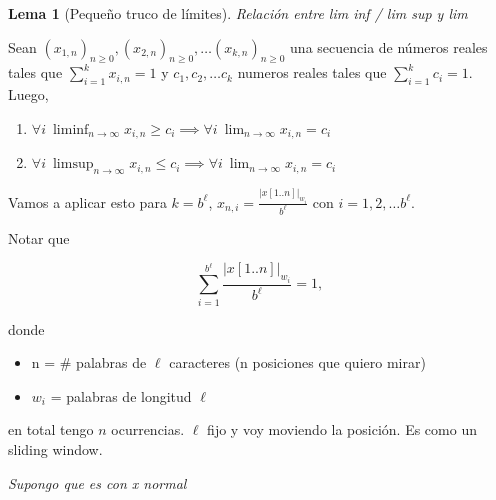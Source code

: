 \documentclass{report}
\theoremstyle{definition} %
\newtheorem{lemma}{Lema}[chapter]
\begin{document}
\begin{lemma}[Pequeño truco de límites]\label{prop:lim-trick}
    \textit{Relación entre lim inf / lim sup y lim}


    Sean $(x_{1, n})_{n\geq0}, (x_{2, n})_{n\geq0},\dots (x_{k, n})_{n\geq0}$
    una secuencia de números reales tales que $\sum_{i=1}^{k} x_{i, n} = 1$ y
    $c_1, c_2, \dots c_k$ numeros reales tales que $\sum_{i=1}^{k} c_i = 1$.
    Luego,
    
    \begin{enumerate}
        \item $\forall i\ \liminf_{n\to \infty} x_{i, n} \geq c_i
        \implies \forall i\ \lim_{n\to \infty} x_{i, n} = c_i$

        \item $\forall i\ \limsup_{n\to \infty} x_{i, n} \leq c_i
        \implies \forall i\ \lim_{n\to \infty} x_{i, n} = c_i$
    \end{enumerate}

    Vamos a aplicar esto para $k = b^\ell$, 
    $x_{n, i} = \frac{|x[1..n]|_{w_i}}{b^\ell}$ con $i = 1, 2, \dots b^\ell$.
    
    Notar que
    
    $$\sum_{i=1}^{b^\ell} \frac{|x[1..n]|_{w_i}}{b^\ell} = 1,$$
    
    donde

    \begin{itemize}
        \item n = \# palabras de $\ell$ caracteres (n posiciones que quiero mirar)
        \item $w_i$ = palabras de longitud $\ell$
    \end{itemize}

    en total tengo $n$ ocurrencias. $\ell$ fijo y voy moviendo la posición. Es
    como un sliding window.


    \textit{Supongo que es con x normal}
\end{lemma}
\end{document}

